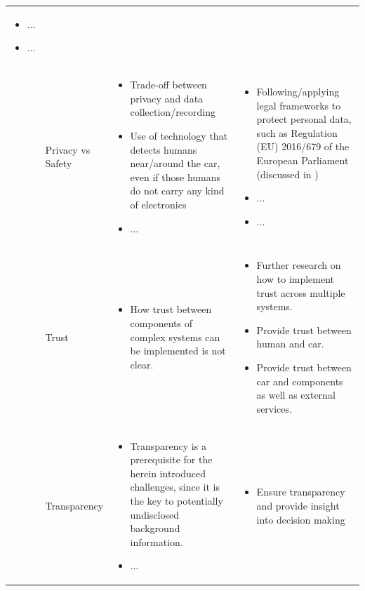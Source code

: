 \begin{table}
\begin{small}
\begin{supertabular}{>{}p{.02\textwidth}|>{\raggedright}p{.105\textwidth}>{\raggedright}p{.4\textwidth}>{\raggedright}p{.4\textwidth}}
					\begin{itemize}
					\item ...
					\item ...
					\end{itemize}										 
 			 \tabularnewline {}
			& Privacy vs Safety & 
				\begin{itemize}
					\item Trade-off between privacy and data collection/recording
					\item Use of technology that detects humans near/around the car, even if those humans do not carry any kind of electronics  
					\item ...
				\end{itemize}					  & 
				\begin{itemize}
					\item Following/applying legal frameworks to protect personal data, such as Regulation (EU) 2016/679 of the European Parliament \cite{EuropeanUnion2016} (discussed in \cite{doi:10.1093/idpl/ipx005})
					\item ...
					\item ...
				\end{itemize}	
 			 \tabularnewline {}
			& Trust & 
				\begin{itemize}
					\item How trust between components of complex systems can be implemented is not clear.
				\end{itemize}					  & 
				\begin{itemize}
					\item Further research on how to implement trust across multiple systems. 
					\item Provide trust between human and car.
					\item Provide trust between car and components as well as external services.
				\end{itemize}
 			 \tabularnewline {}
			& Transparency & 
                \begin{itemize}
					\item Transparency is a prerequisite for the herein introduced challenges, since it is the key to potentially undisclosed background information.
					\item ...
				\end{itemize}					  & 
				\begin{itemize}
					\item Ensure transparency and provide insight into decision making

\end{itemize}
\end{supertabular}
\end{small}
\end{table}
